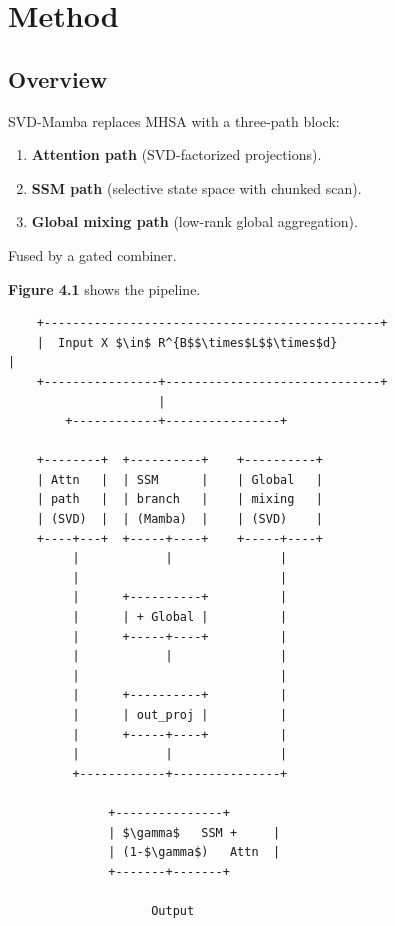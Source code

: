 
\section{Method}

\subsection{Overview}

SVD-Mamba replaces MHSA with a three-path block:

\begin{enumerate}
\item \textbf{Attention path} (SVD-factorized projections).
\item \textbf{SSM path} (selective state space with chunked scan).
\item \textbf{Global mixing path} (low-rank global aggregation).

\end{enumerate}
Fused by a gated combiner.

\textbf{Figure 4.1} shows the pipeline.

\begin{lstlisting}
    +-----------------------------------------------+
    |  Input X $\in$ R^{B$$\times$L$$\times$d}                          |
    +----------------+------------------------------+
                     |
        +------------+----------------+
                                       
    +--------+  +----------+    +----------+
    | Attn   |  | SSM      |    | Global   |
    | path   |  | branch   |    | mixing   |
    | (SVD)  |  | (Mamba)  |    | (SVD)    |
    +----+---+  +-----+----+    +-----+----+
         |            |               |
         |                            |
         |      +----------+          |
         |      | + Global |          |
         |      +-----+----+          |
         |            |               |
         |                            |
         |      +----------+          |
         |      | out_proj |          |
         |      +-----+----+          |
         |            |               |
         +------------+---------------+
                       
              +---------------+
              | $\gamma$   SSM +     |
              | (1-$\gamma$)   Attn  |
              +-------+-------+
                       
                    Output
\end{lstlisting}

